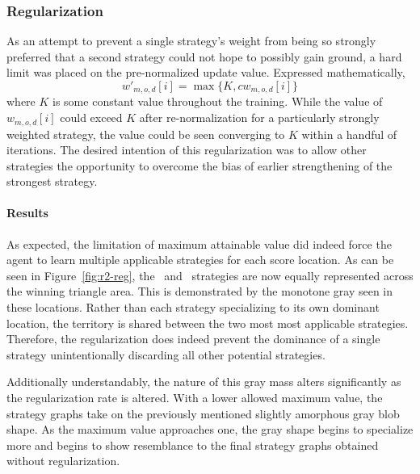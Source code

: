 

\subsubsection{Regularization}


As an attempt to prevent a single strategy's weight from being so strongly 
preferred that a second strategy could not hope to possibly gain ground,
a hard limit was placed on the pre-normalized update value.
%
Expressed mathematically,
\[
    w'_{m,o,d}[i] = \max\{K,cw_{m,o,d}[i]\}
\]
where $K$ is some constant value throughout the training.
%
While the value of $w_{m,o,d}[i]$ could exceed $K$ after re-normalization
for a particularly strongly weighted strategy,
the value could be seen converging to $K$ within a handful of iterations.
%
The desired intention of this regularization was to allow other strategies
the opportunity to overcome the bias of earlier strengthening of the strongest
strategy.

\paragraph{Results}


As expected,
the limitation of maximum attainable value did indeed force the agent to learn
multiple applicable strategies for each score location.
%
As can be seen in Figure~\ref{fig:r2-reg},
the \handmaxmin\ and \handmaxavg\ strategies are now equally represented across
the winning triangle area.
%
This is demonstrated by the monotone gray seen in these locations.
%
Rather than each strategy specializing to its own dominant location,
the territory is shared between the two most most applicable strategies.
%
Therefore,
the regularization does indeed prevent the dominance of a single strategy
unintentionally discarding all other potential strategies.

Additionally understandably,
the nature of this gray mass alters significantly as the regularization rate is
altered.
%
With a lower allowed maximum value,
the strategy graphs take on the previously mentioned slightly amorphous gray
blob shape.
%
As the maximum value approaches one,
the gray shape begins to specialize more and begins to show resemblance to the
final strategy graphs obtained without regularization.


